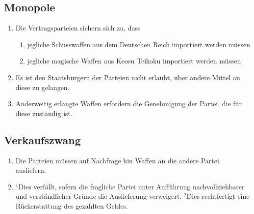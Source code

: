 \documentclass{article}
\begin{document}
\subsection{Monopole}
\begin{enumerate}[(1)]
    \item Die Vertragsparteien sichern sich zu, dass
    \begin{enumerate}[1.]
        \item jegliche Schusswaffen aus dem Deutschen Reich importiert werden müssen
        \item jegliche magische Waffen aus Keosu Teikoku importiert werden müssen
    \end{enumerate}
    \item Es ist den Staatsbürgern der Parteien nicht erlaubt, über andere Mittel an diese zu gelangen.
    \item Anderweitig erlangte Waffen erfordern die Genehmigung der Partei, die für diese zuständig ist.
\end{enumerate}

\subsection{Verkaufszwang}
\begin{enumerate}[(1)]
    \item Die Parteien müssen auf Nachfrage hin Waffen an die andere Partei ausliefern.
    \item ${^1}$Dies verfällt, sofern die fragliche Partei unter Aufführung nachvollziehbarer und verständlicher Gründe die Auslieferung verweigert. ${^2}$Dies rechtfertigt eine Rückerstattung des gezahlten Geldes.
\end{enumerate}
\end{document}

